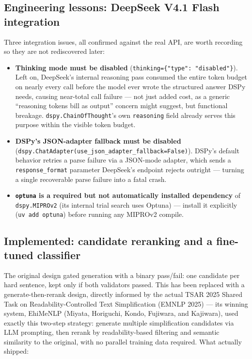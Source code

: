 \documentclass[11pt,a4paper]{article}
\begin{document}
\subsection{Engineering lessons: DeepSeek V4.1 Flash integration}
\label{sec:deepseek-lessons}

Three integration issues, all confirmed against the real API, are worth
recording so they are not rediscovered later:

\begin{itemize}[leftmargin=1.4em]
  \item \textbf{Thinking mode must be disabled}
  (\texttt{thinking=\{"type": "disabled"\}}). Left on, DeepSeek's internal
  reasoning pass consumed the entire token budget on nearly every call
  before the model ever wrote the structured answer DSPy needs, causing
  near-total call failure --- not just added cost, as a generic
  ``reasoning tokens bill as output'' concern might suggest, but functional
  breakage. \texttt{dspy.ChainOfThought}'s own \texttt{reasoning} field
  already serves this purpose within the visible token budget.
  \item \textbf{DSPy's JSON-adapter fallback must be disabled}
  (\texttt{dspy.ChatAdapter(use\_json\_adapter\_fallback=False)}). DSPy's
  default behavior retries a parse failure via a JSON-mode adapter, which
  sends a \texttt{response\_format} parameter DeepSeek's endpoint rejects
  outright --- turning a single recoverable parse failure into a fatal
  crash.
  \item \textbf{\texttt{optuna} is a required but not automatically
  installed dependency} of \texttt{dspy.MIPROv2} (its internal trial
  search uses Optuna) --- install it explicitly
  (\texttt{uv add optuna}) before running any MIPROv2 compile.
\end{itemize}

\subsection{Implemented: candidate reranking and a fine-tuned classifier}
\label{sec:next-phase}

The original design gated generation with a binary pass/fail: one candidate
per hard sentence, kept only if both validators passed. This has been
replaced with a generate-then-rerank design, directly informed by the
actual TSAR 2025 Shared Task on Readability-Controlled Text Simplification
(EMNLP 2025) --- its winning system, EhiMeNLP (Miyata, Horiguchi, Kondo,
Fujiwara, and Kajiwara), used exactly this two-step strategy: generate
multiple simplification candidates via LLM prompting, then rerank by
readability-based filtering and semantic similarity to the original, with
no parallel training data required. What actually shipped:
\end{document}
